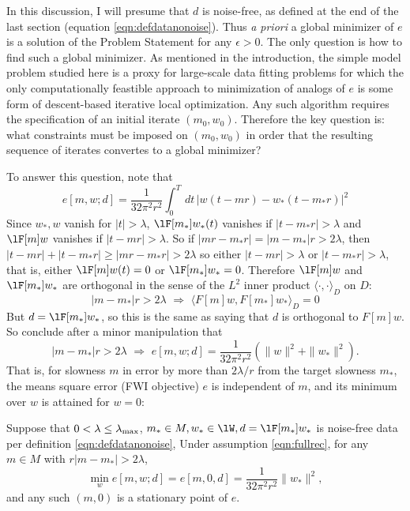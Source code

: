 In this discussion, I will presume that $d$ is 
noise-free, as defined at the end of the last section (equation
\ref{eqn:defdatanonoise}). Thus {\em a priori} a global minimizer of
$e$ is a solution of the Problem Statement for any
$\epsilon > 0$. The only
question is how to find such a global minimizer. As mentioned in the
introduction, the simple model problem studied here is a proxy for
large-scale data fitting problems for which the only computationally
feastible approach to minimization of analogs of $e$
is some form of descent-based iterative local optimization. Any such
algorithm requires the specification of an initial iterate
$(m_0,w_0)$. Therefore the key question is: what
constraints must be imposed on $(m_0,w_0)$ in order that the resulting
sequence of iterates convertes to a global minimizer?  

To answer this question, note that 
\[
 e[m,w;d] =  \frac{1}{32\pi^2
    r^2}\int_0^T\,dt\,\left|w\left(t-mr\right)-w_*\left(t-m_*r\right)\right|^2
\]
Since $w_*, w$ vanish for $|t|>\lambda$,
$\lF[m_*]w_*(t)$ vanishes if $|t-m_*r|>\lambda$ and $\lF[m]w$ vanishes if $|t-mr|>\lambda$. So if $|mr-m_*r|
= |m-m_*|r > 2\lambda$, then $|t-mr|+|t-m_*r| \ge |mr-m_*r| >
2\lambda$ so either $|t-mr|>\lambda$ or $|t-m_*r|>\lambda$, that is,
either $\lF[m]w(t)=0$ or $\lF[m_*]w_*=0$. Therefore $\lF[m]w$ and
$\lF[m_*]w_*$ are orthogonal in the sense of the $L^2$ inner product
$\langle \cdot,\cdot \rangle_D$ on $D$:
\begin{equation}
  \label{eqn:ortho}
  |m- m_*|r > 2\lambda \,\, \Rightarrow \,\, \langle F[m]w,
  F[m_*]w_*\rangle_D = 0
\end{equation}
But $d = \lF[m_*]w_*$, so this is the same as saying that $d$ is
orthogonal to $F[m]w$. So conclude after a minor manipulation that
\begin{equation}
  \label{eqn:iso}
  |m- m_*|r > 2\lambda \,\, \Rightarrow \,\, e[m,w;d]=\frac{1}{32\pi^2
    r^2}(\|w\|^2 + \|w_*\|^2).
\end{equation}
That is, for slowness $m$ in error by more than $2\lambda/r$ from the 
target slowness $m_*$, the means square error (FWI objective) $e$ is independent of
$m$, and its minimum over $w$ is attained for $w=0$:
\begin{theorem}
  \label{thm:fwi}
  Suppose that $0 <\lambda\le \lambda_{\rm max}$,  $m_* \in M, w_*
  \in \lW, d=\lF[m_*]w_*$ is noise-free data per definition \ref{eqn:defdatanonoise},
  Under assumption \ref{eqn:fullrec}, for any $m \in M$ with $r|m-m_*|>2\lambda$,
\begin{equation}
  \label{eqn:isovpm}
 \min_w e[m,w;d]=e[m,0,d]=\frac{1}{32\pi^2 r^2}\|w_*\|^2,
\end{equation}
and any such $(m,0)$ is a stationary point of $e$.
\end{theorem}

